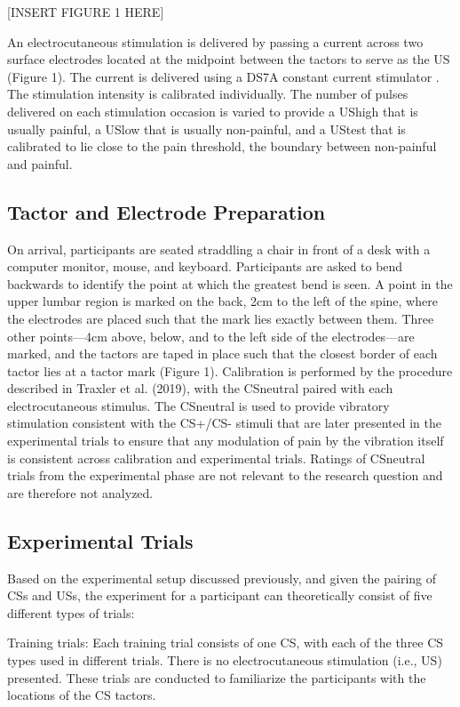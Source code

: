 \documentclass{article}
\begin{document}
[INSERT FIGURE 1 HERE]

An electrocutaneous stimulation is delivered by passing a current across two surface electrodes located at the midpoint between the tactors to serve as the US (Figure 1). The current is delivered using a DS7A constant current stimulator \autocite{Digitimer Limited0}. The stimulation intensity is calibrated individually. The number of pulses delivered on each stimulation occasion is varied to provide a UShigh that is usually painful, a USlow that is usually non-painful, and a UStest that is calibrated to lie close to the pain threshold, the boundary between non-painful and painful.

\subsection{Tactor and Electrode Preparation}

On arrival, participants are seated straddling a chair in front of a desk with a computer monitor, mouse, and keyboard. Participants are asked to bend backwards to identify the point at which the greatest bend is seen. A point in the upper lumbar region is marked on the back, 2cm to the left of the spine, where the electrodes are placed such that the mark lies exactly between them. Three other points—4cm above, below, and to the left side of the electrodes—are marked, and the tactors are taped in place such that the closest border of each tactor lies at a tactor mark (Figure 1). Calibration is performed by the procedure described in Traxler et al. (2019), with the CSneutral paired with each electrocutaneous stimulus. The CSneutral is used to provide vibratory stimulation consistent with the CS+/CS- stimuli that are later presented in the experimental trials to ensure that any modulation of pain by the vibration itself is consistent across calibration and experimental trials. Ratings of CSneutral trials from the experimental phase are not relevant to the research question and are therefore not analyzed.

\subsection{Experimental Trials}

Based on the experimental setup discussed previously, and given the pairing of CSs and USs, the experiment for a participant can theoretically consist of five different types of trials:

Training trials: Each training trial consists of one CS, with each of the three CS types used in different trials. There is no electrocutaneous stimulation (i.e., US) presented. These trials are conducted to familiarize the participants with the locations of the CS tactors. 
\end{document}
